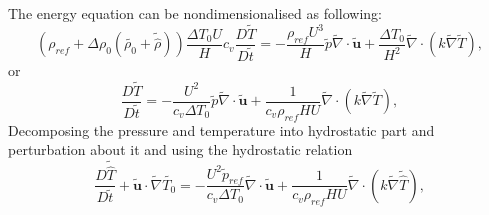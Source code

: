 \documentclass[preprint,12pt]{article}
\begin{document}
 The energy equation can be non\textendash  dimensionalised as following:
 \begin{equation}
  	(\rho_{ref}+\Delta \rho_0 (\tilde{\rho_0}+\tilde{\hat{\rho}}))\frac{\Delta T_0 U}{H}c_v \frac{D{\tilde{T}}}{D{\tilde{t}}}=-\frac{\rho_{ref}U^3}{H}\tilde{p}\tilde{\nabla}\cdot\mathbf{\tilde{u}}+\frac{\Delta T_0}{H^2}\tilde{\nabla}\cdot(k\tilde{\nabla} \tilde{T}),
 \end{equation}
 or
 \begin{equation}
 \frac{D{\tilde{T}}}{D{\tilde{t}}}=-\frac{U^2}{c_v\Delta T_0}\tilde{p}\tilde{\nabla}\cdot\mathbf{\tilde{u}}+\frac{1}{c_v\rho_{ref}HU}\tilde{\nabla}\cdot(k\tilde{\nabla} \tilde{T}),
 \end{equation}
Decomposing the pressure and temperature into hydrostatic part and perturbation about it and using the hydrostatic relation
\begin{equation}
\frac{D{\tilde{\hat{T}}}}{D{\tilde{t}}}+\mathbf{\tilde{u}}\cdot\tilde{\nabla}{\tilde{
		{T_0}}}=-\frac{U^2\tilde{p}_{ref}}{c_v\Delta T_0}\tilde{\nabla}\cdot\mathbf{\tilde{u}}+\frac{1}{c_v\rho_{ref}HU}\tilde{\nabla}\cdot(k\tilde{\nabla} \tilde{\hat{T}}),
\end{equation}
 
\end{document}
